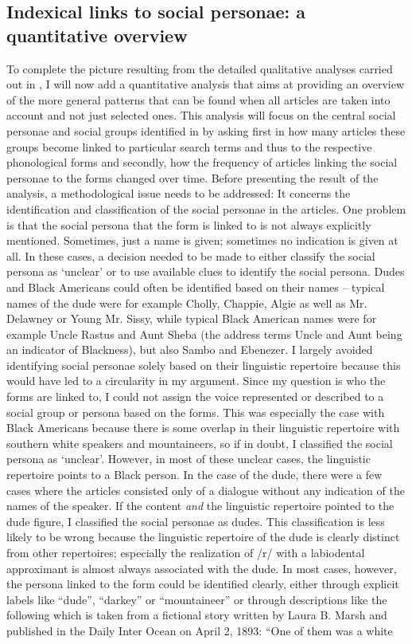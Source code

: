 \subsection{Indexical links to social personae: a quantitative overview}
\label{bkm:Ref10890365}\hypertarget{Toc63021240}{}
To complete the picture resulting from the detailed qualitative analyses carried out in , I will now add a quantitative analysis that aims at providing an overview of the more general patterns that can be found when all articles are taken into account and not just selected ones. This analysis will focus on the central social personae and social groups identified in  by asking first in how many articles these groups become linked to particular search terms and thus to the respective phonological forms and secondly, how the frequency of articles linking the social personae to the forms changed over time. Before presenting the result of the analysis, a methodological issue needs to be addressed: It concerns the identification and classification of the social personae in the articles. One problem is that the social persona that the form is linked to is not always explicitly mentioned. Sometimes, just a name is given; sometimes no indication is given at all. In these cases, a decision needed to be made to either classify the social persona as ‘unclear’ or to use available clues to identify the social persona. Dudes and Black Americans could often be identified based on their names – typical names of the dude were for example Cholly, Chappie, Algie as well as Mr. Delawney or Young Mr. Sissy, while typical Black American names were for example Uncle Rastus and Aunt Sheba (the address terms Uncle and Aunt being an indicator of Blackness), but also Sambo and Ebenezer. I largely avoided identifying social personae solely based on their linguistic repertoire because this would have led to a circularity in my argument. Since my question is who the forms are linked to, I could not assign the voice represented or described to a social group or persona based on the forms. This was especially the case with Black Americans because there is some overlap in their linguistic repertoire with southern white speakers and mountaineers, so if in doubt, I classified the social persona as ‘unclear’. However, in most of these unclear cases, the linguistic repertoire points to a Black person. In the case of the dude, there were a few cases where the articles consisted only of a dialogue without any indication of the names of the speaker. If the content \emph{and} the linguistic repertoire pointed to the dude figure, I classified the social personae as dudes. This classification is less likely to be wrong because the linguistic repertoire of the dude is clearly distinct from other repertoires; especially the realization of /r/ with a labiodental approximant is almost always associated with the dude. In most cases, however, the persona linked to the form could be identified clearly, either through explicit labels like “dude”, “darkey” or “mountaineer” or through descriptions like the following which is taken from a fictional story written by Laura B. Marsh and published in the Daily Inter Ocean on April 2, 1893: “One of them was a white 
